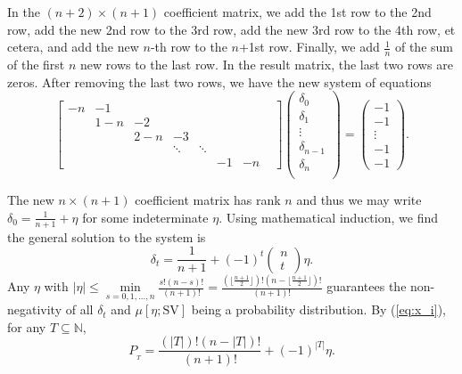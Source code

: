 \documentclass[a4paper,12pt]{article}
\begin{document}
In the $(n+2)\times (n+1)$ coefficient matrix, 
we add the 1st row to the 2nd row,  add the new 2nd row to the 3rd row,  add the new 3rd row to the 4th row, et cetera, and add the new $n$-th row to the $n$+1st row.
Finally, we add $\frac{1}{n}$ of the sum of the first $n$ new rows to the last row. 
In the result matrix, the last two rows are zeros. After removing the last two rows, we have the new system of equations
$$
\left [ 
\begin{array}{cccccccccc}
-n&-1      &              &      &      &     &   &  \\
  &1-n &-2 &    &      &      &               &  \\
  &    &2-n&-3  &      &      &               &  \\
  &             &              &\ddots&\ddots &   &  \\
  &              &              &      &      &-1 &-n
\end{array}
\right ] 
\left (
\begin{array}{c}
\delta_0 	\\
\delta_1 	\\
\vdots \\
\delta_{n-1} \\
\delta_n \\
\end{array}
\right )
= 
\left (
\begin{array}{c}
-1 \\
-1 \\
\vdots \\
-1\\
-1
\end{array}
\right ).
$$

The new $n\times (n+1)$ coefficient matrix has rank $n$ and thus we may write $\delta_0 = \frac{1}{n+1} + \eta$ for some indeterminate $\eta$.
Using mathematical induction, we find the general solution to the system is
\begin{equation} \label{eq:x_i}\tag{A.5}
\delta_t = \frac{1}{n+1} + (-1)^t \left ( \begin{array}{c}n \\ t \end{array} \right ) \eta.
\end{equation}
Any $\eta$ with $|\eta|\le \min\limits_{s=0, 1, ..., n} \frac{s!(n-s)!}{(n+1)!} 
= \frac{(\lfloor \frac{n+1}{2}\rfloor )!  (n - \lfloor \frac{n+1}{2}\rfloor )!}{(n+1)!}$
guarantees the non-negativity of all $\delta_t$ and $\mu[\eta; \mathrm{SV}]$ being a
probability distribution. 
By (\ref{eq:x_i}), for any $T\subseteq \mathbb{N}$,
$$
P_{_T} = \frac{(|T|)!(n-|T|)!}{(n+1)!} + (-1)^{|T|}\eta.
$$
\end{document}
